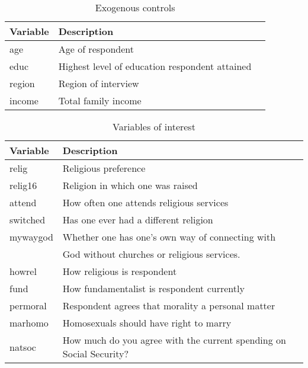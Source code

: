\documentclass{article}
\begin{document}
	\begin{table}[h]
	\caption{Exogenous controls}
	\label{gss-controls}
	\centering
	\begin{tabular}{lll}
		\toprule
		Variable     & Description  \\
		\midrule
		age & Age of respondent \\
		educ & Highest level of education respondent attained \\
		region & Region of interview \\
		income & Total family income \\
		\bottomrule
		\end{tabular}
	\end{table}
	
	\begin{table}[h]
		\caption{Variables of interest}
		\label{gss-vars}
		\centering
		\begin{tabular}{lll}
			\toprule
			Variable     & Description  \\
			\midrule
			relig & Religious preference \\
			relig16 & Religion in which one was raised \\ 
			attend & How often one attends religious services \\
			switched & Has one ever had a different religion \\
			mywaygod & Whether one has one's own way of connecting with \\
				     & God without churches or religious services. \\
			howrel & How religious is respondent \\
			fund & How fundamentalist is respondent currently \\
			permoral & Respondent agrees that morality a personal matter \\
			marhomo & Homosexuals should have right to marry \\
			natsoc & How much do you agree with the current spending on Social Security? \\
			\bottomrule
		\end{tabular}
	\end{table}
	
	\newpage
	\nocite{*}
	
\end{document}
